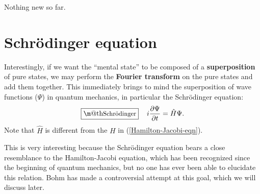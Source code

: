 \documentclass[orivec]{llncs}
\makeatletter
\renewcommand{\boxed}[1]{\fbox{\m@th$\displaystyle\scalebox{0.9}{#1}$} \,}
\makeatother
\begin{document}
Nothing new so far.

\cite{Liberzon2012}

\section{Schr\"odinger equation}

Interestingly, if we want the ``mental state'' to be composed of a \textbf{superposition} of pure states, we may perform the \textbf{Fourier transform} on the pure states and add them together.  This immediately brings to mind the superposition of wave functions ($\Psi$) in quantum mechanics, in particular the Schr\"{o}dinger equation:
\begin{equation}
\boxed{\mbox{Schr\"{o}dinger}} \quad
i \frac{\partial \Psi}{\partial t} = \hat{H} \Psi .
\label{Schrodinger-eqn}
\end{equation}
Note that $\hat{H}$ is different from the $H$ in (\ref{Hamilton-Jacobi-eqn}).

This is very interesting because the Schr\"{o}dinger equation bears a close resemblance to the Hamilton-Jacobi equation, which has been recognized since the beginning of quantum mechanics, but no one has ever been able to elucidate this relation.  Bohm has made a controversial attempt at this goal, which we will discuss later.
\end{document}
